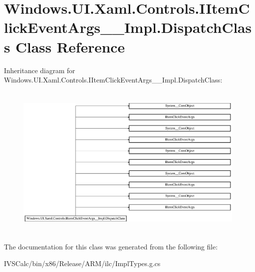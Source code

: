 \hypertarget{class_windows_1_1_u_i_1_1_xaml_1_1_controls_1_1_i_item_click_event_args_____impl_1_1_dispatch_class}{}\section{Windows.\+U\+I.\+Xaml.\+Controls.\+I\+Item\+Click\+Event\+Args\+\_\+\+\_\+\+Impl.\+Dispatch\+Class Class Reference}
\label{class_windows_1_1_u_i_1_1_xaml_1_1_controls_1_1_i_item_click_event_args_____impl_1_1_dispatch_class}
Inheritance diagram for Windows.\+U\+I.\+Xaml.\+Controls.\+I\+Item\+Click\+Event\+Args\+\_\+\+\_\+\+Impl.\+Dispatch\+Class\+:\begin{figure}[H]
\begin{center}
\leavevmode
\includegraphics[height=7.623762cm]{class_windows_1_1_u_i_1_1_xaml_1_1_controls_1_1_i_item_click_event_args_____impl_1_1_dispatch_class}
\end{center}
\end{figure}


The documentation for this class was generated from the following file\+:\begin{DoxyCompactItemize}
\item 
I\+V\+S\+Calc/bin/x86/\+Release/\+A\+R\+M/ilc/Impl\+Types.\+g.\+cs\end{DoxyCompactItemize}
